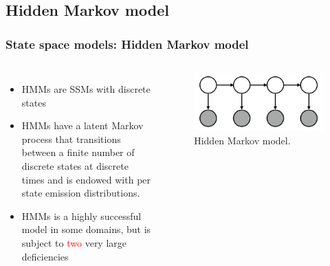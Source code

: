 \documentclass[aspectratio=169]{beamer}
\begin{document}
    \subsection{Hidden Markov model}
    \begin{frame}
        \frametitle{State space models: Hidden Markov model}


        \begin{columns}[c] 


            \begin{itemize}
                \item HMMs are SSMs with discrete states
                \item HMMs have a latent Markov process that transitions between a finite number of discrete states at discrete times and is endowed with per state emission distributions.
                \item HMMs is a highly successful model in some domains, but is subject to \textcolor{red}{two} very large deficiencies
            \end{itemize}


            \begin{figure}
                \includegraphics[width=1.0\linewidth]{hmm.png}
                \caption{Hidden Markov model.}
            \end{figure}

        \end{columns}

    \end{frame}

\end{document}
